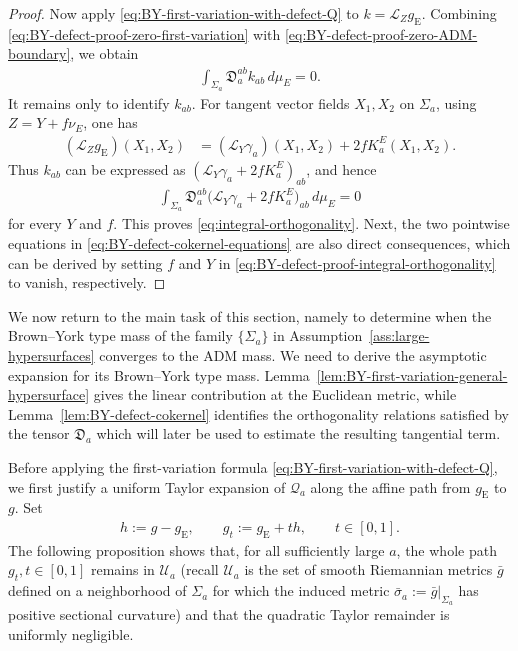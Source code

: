 \documentclass[10pt,a4paper]{amsart}
\newcommand{\gE}{g_{\mathrm{E}}}
\newcommand{\Lie}{\mathcal{L}}
\begin{document}
\begin{proof}
		Now apply \eqref{eq:BY-first-variation-with-defect-Q} to
		$k=\Lie_Z\gE$. Combining
		\eqref{eq:BY-defect-proof-zero-first-variation} with
		\eqref{eq:BY-defect-proof-zero-ADM-boundary}, we obtain
		\begin{align*}
			\int_{\Sigma_a}\mathfrak D_a^{ab}k_{ab}\,d\mu_E=0 .
		\end{align*}
		It remains only to identify $k_{ab}$. For tangent vector fields $X_1,X_2$ on
		$\Sigma_a$, using $Z=Y+f\nu_E$, one has
		\begin{align*}
			(\Lie_Z\gE)(X_1,X_2)
			&=
			(\Lie_Y\gamma_a)(X_1,X_2)
			+
			2fK_a^E(X_1,X_2).
		\end{align*}
		Thus $k_{ab}$ can be expressed as $(\Lie_Y\gamma_a+2fK_a^E)_{ab}$, and hence
		\begin{align}\label{eq:BY-defect-proof-integral-orthogonality}
			\int_{\Sigma_a}
			\mathfrak D_a^{ab}
			\bigl(
			\Lie_Y\gamma_a+2fK_a^E
			\bigr)_{ab}
			\,d\mu_E
			=
			0
		\end{align}
		for every $Y$ and $f$. This proves \eqref{eq:integral-orthogonality}. Next, the two pointwise equations in \eqref{eq:BY-defect-cokernel-equations} are also direct consequences, which can be derived by setting $f$ and $Y$ in \eqref{eq:BY-defect-proof-integral-orthogonality} to vanish, respectively.
	\end{proof}
	
	\medskip
	
	We now return to the main task of this section, namely to determine when
	the Brown--York type mass of the family $\{\Sigma_a\}$ in
	Assumption~\ref{ass:large-hypersurfaces} converges to the ADM mass. We need to derive the asymptotic expansion for its Brown--York type mass. Lemma~\ref{lem:BY-first-variation-general-hypersurface} gives
	the linear contribution at the Euclidean metric, while
	Lemma~\ref{lem:BY-defect-cokernel} identifies the orthogonality
	relations satisfied by the tensor $\mathfrak D_a$ which will later be
	used to estimate the resulting tangential term.
	
	Before applying the first-variation formula \eqref{eq:BY-first-variation-with-defect-Q}, we first justify a
	uniform Taylor expansion of $\mathcal Q_a$ along the affine path from
	$\gE$ to $g$. Set
	\begin{align*}
		h:=g-\gE,
		\qquad
		g_t:=\gE+t h,
		\qquad
		t\in[0,1].
	\end{align*}
	The following proposition shows that, for all sufficiently large $a$,
	the whole path ${g_t},t\in[0,1]$ remains in $\mathcal U_a$ (recall $\mathcal U_a$ is the set of smooth
	Riemannian metrics $\bar g$ defined on a neighborhood of $\Sigma_a$ for
	which the induced metric $\bar\sigma_a:=\bar g|_{\Sigma_a}$ has positive sectional curvature) and
	that the quadratic Taylor remainder is uniformly negligible.
	
\end{document}
